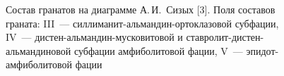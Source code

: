 \begin{figure}[H]
\begin{changemargin}{0cm}{0cm}
\begin{center}
\begin{minipage}[h]{0.5\linewidth}
        \caption{Состав гранатов на диаграмме А.\,И.~Сизых [3]. Поля составов граната: III~--- силлиманит-альмандин-ортоклазовой субфации,  IV~--- дистен-альмандин-мусковитовой  и  ставролит-дистен-альмандиновой субфации амфиболитовой фации, V~--- эпидот-амфиболитовой фации}
        \label{fig:polzunenkov-fig3}
    \end{minipage}


  \end{center}
\end{changemargin}

\end{figure}
